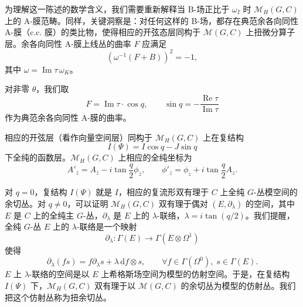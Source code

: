\documentclass[11pt,a4paper,UTF8]{ctexart}
\begin{document}

为理解这一陈述的数学含义，我们需要重新解释当 B-场正比于 $\omega_{I}$ 时 $\mathcal{M}_{H}(G,C)$ 上的 A-膜范畴。同样，关键洞察是：对任何这样的 B-场，都存在典范余各向同性 A-膜（c.c. 膜）的类比物，使得相应的开弦态层同构于 $\mathcal{M}(G,C)$ 上扭微分算子层。余各向同性 A-膜上线丛的曲率 $F$ 应满足
\[
    \left(\omega^{-1}(F+B)\right)^{2}=-1,
\]
其中 $\omega=\operatorname{Im}\tau\,\omega_{K}$。


对非零 $\theta$，我们取
\[
    F=\operatorname{Im}\tau\cdot\cos q,\qquad
    \sin q=-\frac{\operatorname{Re}\tau}{\operatorname{Im}\tau}
\]
作为典范余各向同性 A-膜的曲率。


相应的开弦层（看作向量空间层）同构于 $\mathcal{M}_{H}(G,C)$ 上在复结构
\[
    I(\Psi)=I\cos q-J\sin q
\]
下全纯的函数层。$\mathcal{M}_{H}(G,C)$ 上相应的全纯坐标为
\[
    A'_{\bar z}=A_{\bar z}-i\tan\frac{q}{2}\phi_{\bar z},\qquad
    \phi'_{z}=\phi_{z}+i\tan\frac{q}{2}A_{z}.
\]


对 $q=0$，复结构 $I(\Psi)$ 就是 $I$，相应的复流形双有理于 $C$ 上全纯 $G$-丛模空间的余切丛。对 $q\neq 0$，可以证明 $\mathcal{M}_{H}(G,C)$ 双有理于偶对 $(E,\partial_{\lambda})$ 的空间，其中 $E$ 是 $C$ 上的全纯主 $G$-丛，$\partial_{\lambda}$ 是 $E$ 上的 $\lambda$-联络，$\lambda=i\tan(q/2)$。我们提醒，全纯 $G$-丛 $E$ 上的 $\lambda$-联络是一个映射
\[
    \partial_{\lambda}:\Gamma(E)\to\Gamma(E\otimes\Omega^{1})
\]
使得
\[
    \partial_{\lambda}(fs)=f\partial_{\lambda}s+\lambda\,\mathrm{d}f\otimes s,\qquad
    \forall f\in\Gamma(\Omega^{0}),\; s\in\Gamma(E).
\]
    $E$ 上 $\lambda$-联络的空间是以 $E$ 上希格斯场空间为模型的仿射空间。于是，在复结构 $I(\Psi)$ 下，$\mathcal{M}_{H}(G,C)$ 双有理于以 $\mathcal{M}(G,C)$ 的余切丛为模型的仿射丛。我们把这个仿射丛称为扭余切丛。
\end{document}
